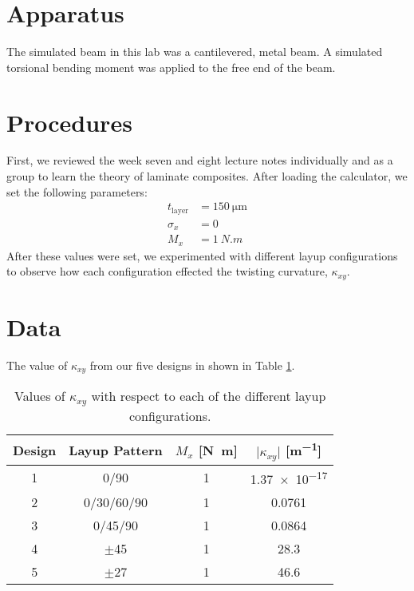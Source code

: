 \documentclass[12 pt]{article}
\begin{document}
\section{Apparatus} \label{apparatus}
The simulated beam in this lab was a cantilevered, metal  beam. A simulated torsional bending moment was applied to the free end of the beam.

\section{Procedures} \label{procedures}
First, we reviewed the week seven and eight lecture notes individually and as a group to learn the theory of laminate composites. After loading the calculator, we set the following parameters:
\begin{align*}
	t_\mathrm{layer}&=\qty{150}{\micro\meter}\\
	\sigma_x&=0\\
	M_x&=\qty{1}{N.m}
\end{align*}
After these values were set, we experimented with different layup configurations to observe how each configuration effected the twisting curvature, $\kappa_{xy}$.  

\section{Data} \label{data}
The value of $\kappa_{xy}$ from our five designs in shown in Table \ref{tbl:data}.

\begin{table}[!htbp]
\caption{Values of $\kappa_{xy}$ with respect to each of the different layup configurations.}
\begin{center}
	\begin{tabular}{| c | c | c | c |}
		\hline
		Design&Layup Pattern&$M_x$ [\unit{N.m}]&$\lvert\kappa_{xy}\rvert$ [\unit{m^{-1}}]\\
		\hline
		\num{1}&\num{0}/\num{90}&1&\num{1.37e-17}\\
		\hline
		\num{2}&\num{0}/\num{30}/\num{60}/\num{90}&1&\num{0.0761}\\
		\hline
		\num{3}&\num{0}/\num{45}/\num{90}&1&\num{0.0864}\\
		\hline
		\num{4}&$\pm$\num{45}&1&\num{28.3}\\
		\hline
		\num{5}&$\pm$\num{27}&1&\num{46.6}\\
		\hline
	\end{tabular}
\end{center}
\label{tbl:data}
\end{table}
\end{document}
